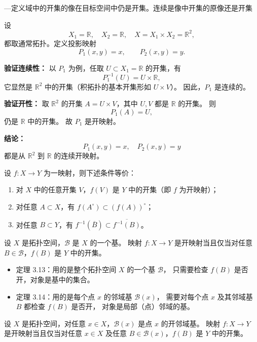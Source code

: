 \begin{note}
    —定义域中的开集的像在目标空间中仍是开集。连续是像中开集的原像还是开集
\end{note}
\begin{example}[二维欧氏空间中的投影映射]\label{ex:projection-R2}
设
\[
X_1=\mathbb{R}, \quad X_2=\mathbb{R}, \quad
X=X_1\times X_2=\mathbb{R}^2,
\]
都取通常拓扑。定义投影映射
\[
P_1(x,y)=x, \qquad P_2(x,y)=y.
\]

\textbf{验证连续性：}  
以 $P_1$ 为例，任取 $U\subset X_1=\mathbb{R}$ 的开集，有
\[
P_1^{-1}(U)=U\times\mathbb{R},
\]
它显然是 $\mathbb{R}^2$ 中的开集（积拓扑的基本开集形如 $U\times V$）。  
因此，$P_1$ 是连续的。

\textbf{验证开性：}  
取 $\mathbb{R}^2$ 的开集 $A=U\times V$，其中 $U,V$ 都是 $\mathbb{R}$ 的开集。  
则
\[
P_1(A)=U,
\]
仍是 $\mathbb{R}$ 中的开集。  
故 $P_1$ 是开映射。

\textbf{结论：}  
\[
P_1(x,y)=x,\quad P_2(x,y)=y
\]
都是从 $\mathbb{R}^2$ 到 $\mathbb{R}$ 的连续开映射。
\end{example}
\begin{theorem}[开映射的等价刻画]\label{thm:open-map-equiv}
设 $f:X\to Y$ 为一映射，则下述条件等价：
\begin{enumerate}[(1)]
  \item 对 $X$ 中的任意开集 $V$，$f(V)$ 是 $Y$ 中的开集（即 $f$ 为开映射）；
  \item 对任意 $A\subset X$，有 \( f(A^\circ)\subset (f(A))^\circ \)；
  \item 对任意 $B\subset Y$，有 \( f^{-1}(\overline{B})\subset \overline{f^{-1}(B)} \)。
\end{enumerate}
\end{theorem}
\begin{theorem}[基中子集映射到Y还是开集]
设 $X$ 是拓扑空间，$\mathcal{B}$ 是 $X$ 的一个基。
映射 $f : X \to Y$ 是开映射当且仅当对任意 $B \in \mathcal{B}$，$f(B)$ 是 $Y$ 中的开集。
\end{theorem}
\begin{itemize}
    \item 定理 3.13：用的是整个拓扑空间 $X$ 的一个基 $\mathcal B$，  
          只需要检查 $f(B)$ 是否开，对象是基中的集合。

    \item 定理 3.14：用的是每个点 $x$ 的邻域基 $\mathcal B(x)$，  
          需要对每个点 $x$ 及其邻域基 $B$ 都检查 $f(B)$ 是否开，  
          对象是局部（点）邻域的基。
\end{itemize}
\begin{theorem}
设 $X$ 是拓扑空间，对任意 $x \in X$，$\mathcal{B}(x)$ 是点 $x$ 的开邻域基。
映射 $f : X \to Y$ 是开映射当且仅当对任意 $x \in X$ 及任意 $B \in \mathcal{B}(x)$，$f(B)$ 是 $Y$ 中的开集。
\end{theorem}

